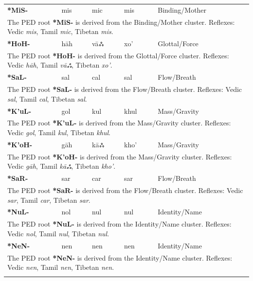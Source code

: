 \begin{longtable}{p{} p{} p{} p{} p{}}
\textbf{*MiS-} & mis & mic & mis & Binding/Mother \\ 
\multicolumn{5}{p{\textwidth}}{\small The PED root \textbf{*MiS-} is derived from the Binding/Mother cluster. Reflexes: Vedic \textit{mis}, Tamil \textit{mic}, Tibetan \textit{mis}. } \\ \addlinespace 
\textbf{*HoH-} & hāh & vāஃ & xo' & Glottal/Force \\ 
\multicolumn{5}{p{\textwidth}}{\small The PED root \textbf{*HoH-} is derived from the Glottal/Force cluster. Reflexes: Vedic \textit{hāh}, Tamil \textit{vāஃ}, Tibetan \textit{xo'}. } \\ \addlinespace 
\textbf{*SaL-} & sal & cal & sal & Flow/Breath \\ 
\multicolumn{5}{p{\textwidth}}{\small The PED root \textbf{*SaL-} is derived from the Flow/Breath cluster. Reflexes: Vedic \textit{sal}, Tamil \textit{cal}, Tibetan \textit{sal}. } \\ \addlinespace 
\textbf{*K'uL-} & gol & kul & khul & Mass/Gravity \\ 
\multicolumn{5}{p{\textwidth}}{\small The PED root \textbf{*K'uL-} is derived from the Mass/Gravity cluster. Reflexes: Vedic \textit{gol}, Tamil \textit{kul}, Tibetan \textit{khul}. } \\ \addlinespace 
\textbf{*K'oH-} & gāh & kāஃ & kho' & Mass/Gravity \\ 
\multicolumn{5}{p{\textwidth}}{\small The PED root \textbf{*K'oH-} is derived from the Mass/Gravity cluster. Reflexes: Vedic \textit{gāh}, Tamil \textit{kāஃ}, Tibetan \textit{kho'}. } \\ \addlinespace 
\textbf{*SaR-} & sar & car & sar & Flow/Breath \\ 
\multicolumn{5}{p{\textwidth}}{\small The PED root \textbf{*SaR-} is derived from the Flow/Breath cluster. Reflexes: Vedic \textit{sar}, Tamil \textit{car}, Tibetan \textit{sar}. } \\ \addlinespace 
\textbf{*NuL-} & nol & nul & nul & Identity/Name \\ 
\multicolumn{5}{p{\textwidth}}{\small The PED root \textbf{*NuL-} is derived from the Identity/Name cluster. Reflexes: Vedic \textit{nol}, Tamil \textit{nul}, Tibetan \textit{nul}. } \\ \addlinespace 
\textbf{*NeN-} & nen & nen & nen & Identity/Name \\ 
\multicolumn{5}{p{\textwidth}}{\small The PED root \textbf{*NeN-} is derived from the Identity/Name cluster. Reflexes: Vedic \textit{nen}, Tamil \textit{nen}, Tibetan \textit{nen}. } \\ \addlinespace 

\end{longtable}

